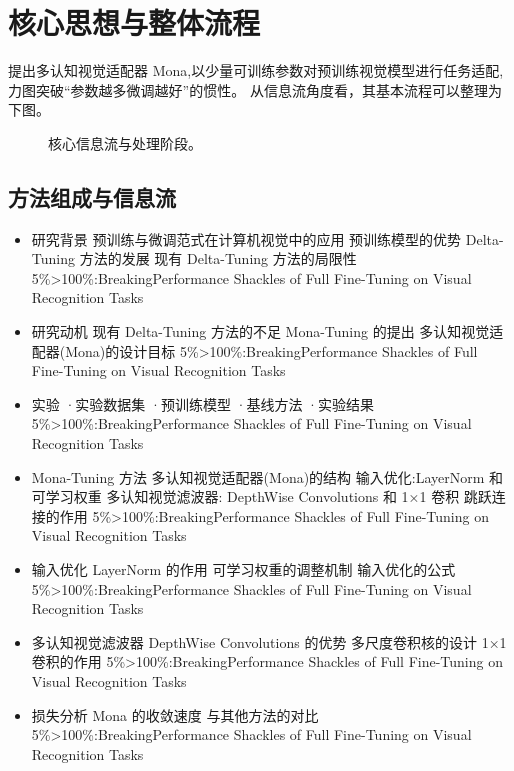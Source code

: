 \documentclass[UTF8,11pt,a4paper]{ctexart}
\begin{document}
\section{核心思想与整体流程}
提出多认知视觉适配器 Mona,以少量可训练参数对预训练视觉模型进行任务适配,力图突破“参数越多微调越好”的惯性。 从信息流角度看，其基本流程可以整理为下图。

\begin{figure}[H]
\centering
{}
\caption{核心信息流与处理阶段。}
\end{figure}

\subsection{方法组成与信息流}
\begin{itemize}
\item 研究背景 预训练与微调范式在计算机视觉中的应用 预训练模型的优势 Delta-Tuning 方法的发展 现有 Delta-Tuning 方法的局限性 5\%>100\%:BreakingPerformance Shackles of Full Fine-Tuning on Visual Recognition Tasks
\item 研究动机 现有 Delta-Tuning 方法的不足 Mona-Tuning 的提出 多认知视觉适配器(Mona)的设计目标 5\%>100\%:BreakingPerformance Shackles of Full Fine-Tuning on Visual Recognition Tasks
\item 实验 ·实验数据集 ·预训练模型 ·基线方法 ·实验结果 5\%>100\%:BreakingPerformance Shackles of Full Fine-Tuning on Visual Recognition Tasks
\item Mona-Tuning 方法 多认知视觉适配器(Mona)的结构 输入优化:LayerNorm 和可学习权重 多认知视觉滤波器: DepthWise Convolutions 和 1×1 卷积 跳跃连接的作用 5\%>100\%:BreakingPerformance Shackles of Full Fine-Tuning on Visual Recognition Tasks
\item 输入优化 LayerNorm 的作用 可学习权重的调整机制 输入优化的公式 5\%>100\%:BreakingPerformance Shackles of Full Fine-Tuning on Visual Recognition Tasks
\item 多认知视觉滤波器 DepthWise Convolutions 的优势 多尺度卷积核的设计 1×1 卷积的作用 5\%>100\%:BreakingPerformance Shackles of Full Fine-Tuning on Visual Recognition Tasks
\item 损失分析 Mona 的收敛速度 与其他方法的对比 5\%>100\%:BreakingPerformance Shackles of Full Fine-Tuning on Visual Recognition Tasks
\end{itemize}
\end{document}

